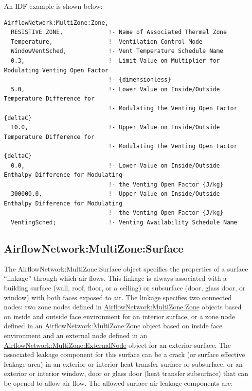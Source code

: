 An IDF example is shown below:

\begin{lstlisting}
AirflowNetwork:MultiZone:Zone,
  RESISTIVE ZONE,             !- Name of Associated Thermal Zone
  Temperature,                !- Ventilation Control Mode
  WindowVentSched,            !- Vent Temperature Schedule Name
  0.3,                        !- Limit Value on Multiplier for Modulating Venting Open Factor
                              !- {dimensionless}
  5.0,                        !- Lower Value on Inside/Outside Temperature Difference for
                              !- Modulating the Venting Open Factor {deltaC}
  10.0,                       !- Upper Value on Inside/Outside Temperature Difference for
                              !- Modulating the Venting Open Factor {deltaC}
  0.0,                        !- Lower Value on Inside/Outside Enthalpy Difference for Modulating
                              !- the Venting Open Factor {J/kg}
  300000.0,                   !- Upper Value on Inside/Outside Enthalpy Difference for Modulating
                              !- the Venting Open Factor {J/kg}
  VentingSched;               !- Venting Availability Schedule Name
\end{lstlisting}

\subsection{AirflowNetwork:MultiZone:Surface}\label{airflownetworkmultizonesurface}

The AirflowNetwork:MultiZone:Surface object specifies the properties of a surface ``linkage'' through which air flows. This linkage is always associated with a building surface (wall, roof, floor, or a ceiling) or subsurface (door, glass door, or window) with both faces exposed to air. The linkage specifies two connected nodes: two zone nodes defined in \hyperref[airflownetworkmultizonezone]{AirflowNetwork:MultiZone:Zone} objects based on inside and outside face environment for an interior surface, or a zone node defined in an \hyperref[airflownetworkmultizonezone]{AirflowNetwork:MultiZone:Zone} object based on inside face environment and an external node defined in an \hyperref[airflownetworkmultizoneexternalnode]{AirflowNetwork:MultiZone:ExternalNode} object for an exterior surface. The associated leakage component for this surface can be a crack (or surface effective leakage area) in an exterior or interior heat transfer surface or subsurface, or an exterior or interior window, door or glass door (heat transfer subsurface) that can be opened to allow air flow. The allowed surface air leakage components are:

